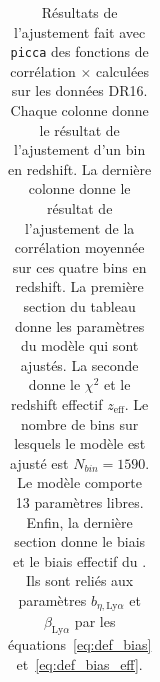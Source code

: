 \documentclass[11pt, twoside, a4paper, openright]{report}
\begin{document}
\begin{table}[]
  \centering
  \caption{Résultats de l'ajustement fait avec \texttt{picca} des fonctions de corrélation \lya{}$\times$\lya{} calculées sur les données DR16. Chaque colonne donne le résultat de l'ajustement d'un bin en redshift. La dernière colonne donne le résultat de l'ajustement de la corrélation moyennée sur ces quatre bins en redshift. La première section du tableau donne les paramètres du modèle qui sont ajustés. La seconde donne le $\chi^2$ et le redshift effectif $z_{\mathrm{eff}}$. Le nombre de bins sur lesquels le modèle est ajusté est $N_{bin} = \num{1590}$. Le modèle comporte \num{13} paramètres libres. Enfin, la dernière section donne le biais et le biais effectif du \lya{}. Ils sont reliés aux paramètres $b_{\eta, \mathrm{Ly}\alpha}$ et $\beta_{\mathrm{Ly}\alpha}$ par les équations~\ref{eq:def_bias} et~\ref{eq:def_bias_eff}.}
  \label{tab:dr16_4bins}
  \footnotesize
  \begin{tabular}{lccccc}

\end{tabular}
\end{table}
\end{document}
